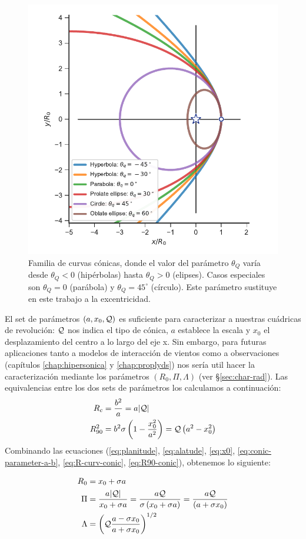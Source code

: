 \begin{figure}
  \includegraphics[width = 0.5\linewidth]{./Figures/conic1}
  \caption{Familia de curvas cónicas, donde el valor del parámetro $\theta_Q$ varía desde $\theta_Q < 0$ (hipérbolas) hasta $\theta_Q > 0$ (elipses). Casos especiales son $\theta_Q = 0$ (parábola) y $\theta_Q = 45^\circ$ (círculo). Este parámetro sustituye en este trabajo a la excentricidad.}
  \label{fig:conics-family}
\end{figure}
El set de parámetros $(a, x_0, \mathcal{Q})$ es suficiente para caracterizar a nuestras cuádricas de revolución: $\mathcal{Q}$ nos indica el tipo de cónica, $a$ establece la escala y $x_0$ el desplazamiento del centro a lo largo del eje x. Sin embargo, para futuras aplicaciones tanto a modelos de interacción de vientos como a observaciones (capítulos \ref{chap:hipersonica} y \ref{chap:proplyds}) nos sería util hacer la caracterización mediante los parámetros $(R_0, \Pi, \Lambda)$ (ver \S \ref{sec:char-rad}). Las equivalencias entre los dos sets de parámetros los calculamos a continuación:
\begin{align} 
  R_c &= \frac{b^2}{a} = a|\mathcal{Q}|\label{eq:R-curv-conic}\\
  R^2_{90} &= b^2\sigma\left(1 - \frac{x^2_0}{a^2}\right) = \mathcal{Q}\left(a^2 - x^2_0\right)\label{eq:R90-conic} 
\end{align}
Combinando las ecuaciones (\ref{eq:planitude}, \ref{eq:alatude}, \ref{eq:x0}, \ref{eq:conic-parameter-a-b}, \ref{eq:R-curv-conic}, \ref{eq:R90-conic}), obtenemos lo siguiente:

\begin{align}
  R_0 &= x_0 + \sigma a \\
  \Pi &= \frac{a|\mathcal{Q}|}{x_0 + \sigma a} = \frac{a\mathcal{Q}}{\sigma\left(x_0 + \sigma a\right)} = \frac{a\mathcal{Q}}{\left(a + \sigma x_0\right)}\\
  \Lambda &= \left(\mathcal{Q}\frac{a-\sigma x_0}{a + \sigma x_0}\right)^{1/2}
\end{align}

